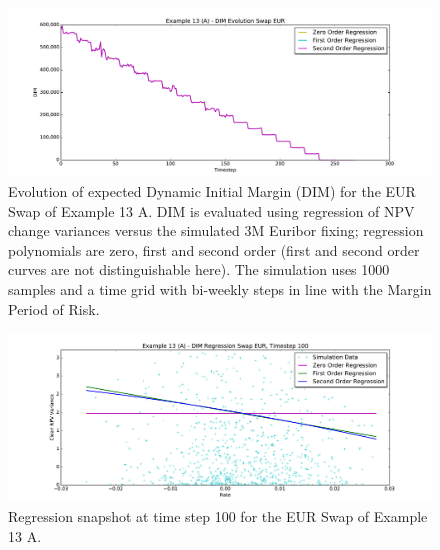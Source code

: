 \documentclass[12pt, a4paper]{article}
\begin{document}
{\begin{figure}[h!]
\begin{center}
\includegraphics[scale=0.45]{mpl_dim_evolution_A_swap_eur.pdf}
\end{center}
\caption{Evolution of expected Dynamic Initial Margin (DIM) for the EUR Swap of Example 13 A. DIM is evaluated using
  regression of NPV change variances versus the simulated 3M Euribor fixing; regression polynomials are zero, first and
  second order (first and second order curves are not distinguishable here). The simulation uses 1000 samples and a time
  grid with bi-weekly steps in line with the Margin Period of Risk.}
\label{fig_ex13a_evolution}
\end{figure}

\begin{figure}[h!]
\begin{center}
\includegraphics[scale=0.45]{mpl_dim_regression_A_swap_eur.pdf}
\end{center}
\caption{Regression snapshot at time step 100 for the EUR Swap of Example 13 A.}
\label{fig_ex13a_regression}
\end{figure}

}
\end{document}
